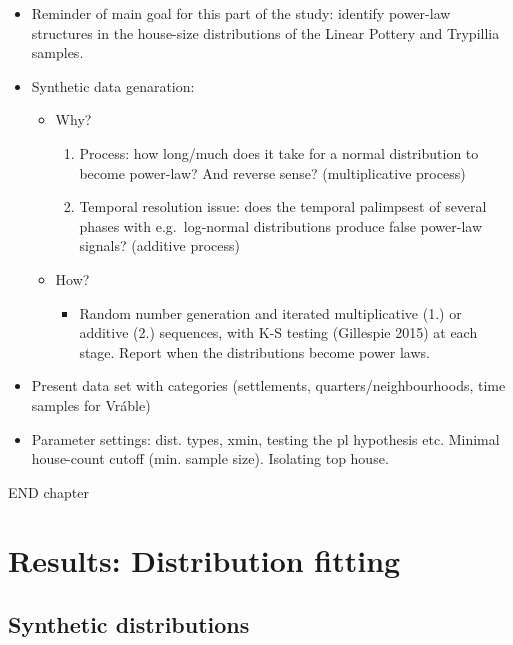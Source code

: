 \documentclass[
  12pt,
]{book}
\providecommand{\tightlist}{%
  \setlength{\itemsep}{0pt}\setlength{\parskip}{0pt}}
\begin{document}
\begin{itemize}
\item
  Reminder of main goal for this part of the study: identify power-law structures in the house-size distributions of the Linear Pottery and Trypillia samples.
\item
  Synthetic data genaration:

  \begin{itemize}
  \item
    Why?

    \begin{enumerate}
    \def\labelenumi{\arabic{enumi}.}
    \item
      Process: how long/much does it take for a normal distribution to become power-law? And reverse sense? (multiplicative process)
    \item
      Temporal resolution issue: does the temporal palimpsest of several phases with e.g.~log-normal distributions produce false power-law signals? (additive process)
    \end{enumerate}
  \item
    How?

    \begin{itemize}
    \tightlist
    \item
      Random number generation and iterated multiplicative (1.) or additive (2.) sequences, with K-S testing (Gillespie 2015) at each stage. Report when the distributions become power laws.
    \end{itemize}
  \end{itemize}
\item
  Present data set with categories (settlements, quarters/neighbourhoods, time samples for Vráble)
\item
  Parameter settings: dist. types, xmin, testing the pl hypothesis etc. Minimal house-count cutoff (min. sample size). Isolating top house.
\end{itemize}

END chapter

\hypertarget{results-distfit}{%
\chapter{Results: Distribution fitting}\label{results-distfit}}

\hypertarget{distfit-synth}{%
\section{Synthetic distributions}\label{distfit-synth}}
\end{document}

